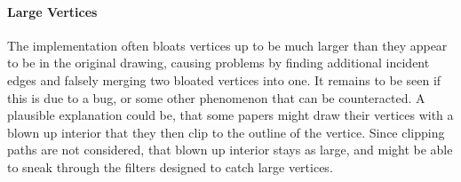 \documentclass[practical,english]{info1thesis}
\begin{document}
\paragraph{Large Vertices}\label{sec:large}
The implementation often bloats vertices up to be much larger than they appear to be in the original drawing, causing problems by finding additional incident edges and falsely merging two bloated vertices into one.
It remains to be seen if this is due to a bug, or some other phenomenon that can be counteracted.
A plausible explanation could be, that some papers might draw their vertices with a blown up interior that they then clip to the outline of the vertice.
Since clipping paths are not considered, that blown up interior stays as large, and might be able to sneak through the filters designed to catch large vertices.
\clearpage


\end{document}
